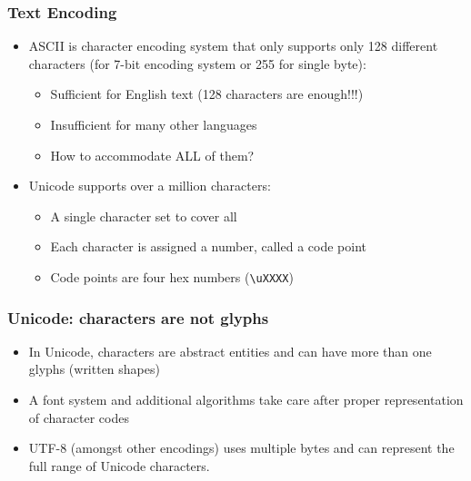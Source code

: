 \begin{frame}[fragile]\frametitle{Text Encoding}

\begin{itemize}
\item ASCII is character encoding system that only supports only 128 different characters (for 7-bit encoding system or 255 for single byte):
	\begin{itemize}
	\item Sufficient for English text (128 characters are enough!!!)
	\item Insufficient for many other languages
	\item How to accommodate ALL of them?
	\end{itemize}
\item Unicode supports over a million characters:
	\begin{itemize}
	\item A single character set to cover all
	\item Each character is assigned a number, called a code point
	\item Code points are four hex numbers (\lstinline|\uXXXX|)
	\end{itemize}	
\end{itemize}
\end{frame}

\begin{frame}[fragile]\frametitle{Unicode: characters are not glyphs}
\begin{itemize}
\item In Unicode, characters are abstract entities and can have more than one glyphs (written shapes)
\item A font system and additional algorithms take care after proper representation of character codes
\item UTF-8 (amongst other encodings) uses multiple bytes and can represent the full range of Unicode characters.
\end{itemize}
\end{frame}


